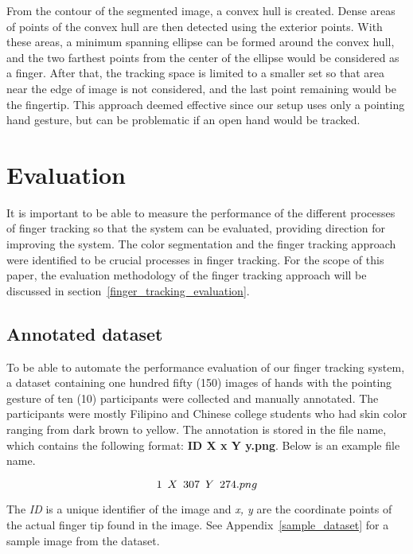 \documentclass{acm_proc_article-sp}
\begin{document}

From the contour of the segmented image, a convex hull is created. Dense areas of points of the convex hull are then detected using the exterior points. With these areas, a minimum spanning ellipse can be formed around the convex hull, and the two farthest points from the center of the ellipse would be considered as a finger. After that, the tracking space is limited to a smaller set so that area near the edge of image is not considered, and the last point remaining would be the fingertip. This approach deemed effective since our setup uses only a pointing hand gesture, but can be problematic if an open hand would be tracked.

\section{Evaluation}

It is important to be able to measure the performance of the different processes of finger tracking so that the system can be evaluated, providing direction for improving the system. The color segmentation and the finger tracking approach were identified to be crucial processes in finger tracking. For the scope of this paper, the evaluation methodology of the finger tracking approach will be discussed in section~\ref{finger_tracking_evaluation}.


\subsection{Annotated dataset}
To be able to automate the performance evaluation of our finger tracking system, a dataset containing one hundred fifty (150) images of hands with the pointing gesture of ten (10) participants were collected and manually annotated. The participants were mostly Filipino and Chinese college students who had skin color ranging from dark brown to yellow. The annotation is stored in the file name, which contains the following format: \textbf{ID X x Y y.png}. Below is an example file name.

\[
1 \enskip X \enskip 307 \enskip Y \enskip 274 .png
\]


The \textit{ID} is a unique identifier of the image and \textit{x, y} are the coordinate points of the actual finger tip found in the image. See Appendix~\ref{sample_dataset} for a sample image from the dataset.
\end{document}
